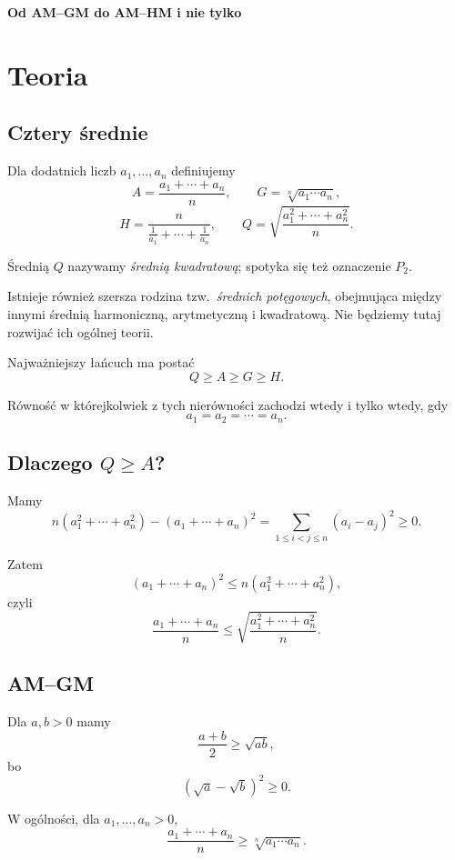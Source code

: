 \documentclass{lecture-kuznia}
\def\title{Od AM--GM do AM--HM i nie tylko}
\begin{document}
\begin{center}
	{\LARGE\textbf{\title{}}}
\end{center}

\section{Teoria}

\subsection{Cztery średnie}

Dla dodatnich liczb $a_1,\dots,a_n$ definiujemy
\[
	A=\frac{a_1+\cdots+a_n}{n},\qquad
	G=\sqrt[n]{a_1\cdots a_n},
\]
\[
	H=\frac{n}{\frac1{a_1}+\cdots+\frac1{a_n}},\qquad
	Q=\sqrt{\frac{a_1^2+\cdots+a_n^2}{n}}.
\]

Średnią $Q$ nazywamy \emph{średnią kwadratową}; spotyka się też oznaczenie
$P_2$.

Istnieje również szersza rodzina tzw.\ \emph{średnich potęgowych},
obejmująca między innymi średnią harmoniczną, arytmetyczną i kwadratową.
Nie będziemy tutaj rozwijać ich ogólnej teorii.

Najważniejszy łańcuch ma postać
\[
	\boxed{Q\ge A\ge G\ge H}.
\]

Równość w którejkolwiek z tych nierówności zachodzi wtedy i tylko wtedy,
gdy
\[
	a_1=a_2=\cdots=a_n.
\]

\subsection{Dlaczego \texorpdfstring{$Q\ge A$}{Q ≥ A}?}

Mamy
\[
	n(a_1^2+\cdots+a_n^2)-(a_1+\cdots+a_n)^2
	=
	\sum_{1\le i<j\le n}(a_i-a_j)^2\ge0.
\]

Zatem
\[
	(a_1+\cdots+a_n)^2\le n(a_1^2+\cdots+a_n^2),
\]
czyli
\[
	\frac{a_1+\cdots+a_n}{n}
	\le
	\sqrt{\frac{a_1^2+\cdots+a_n^2}{n}}.
\]

\subsection{AM--GM}

Dla $a,b>0$ mamy
\[
	\frac{a+b}{2}\ge \sqrt{ab},
\]
bo
\[
	(\sqrt a-\sqrt b)^2\ge0.
\]

W ogólności, dla $a_1,\dots,a_n>0$,
\[
	\frac{a_1+\cdots+a_n}{n}\ge \sqrt[n]{a_1\cdots a_n}.
\]
\end{document}
